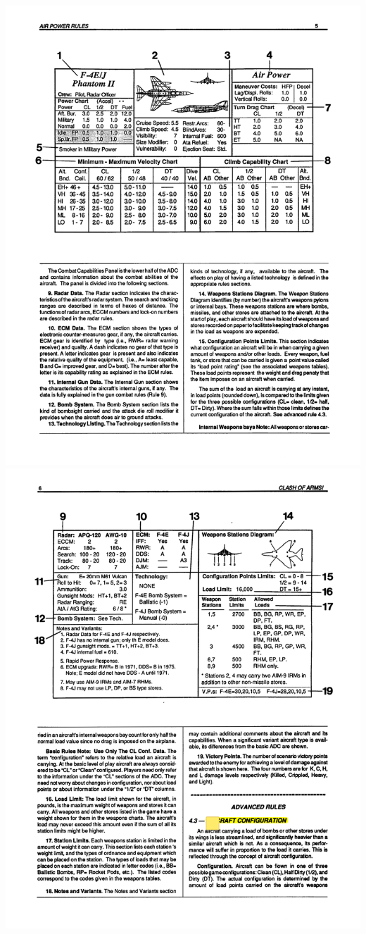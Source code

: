 \begin{FIGURE*}[!ht]

\includegraphics[width=0.7\linewidth]{figures/figure-adc-flight-side.pdf}
\includegraphics[width=0.7\linewidth]{figures/figure-adc-combat-side.pdf}


\end{FIGURE*}